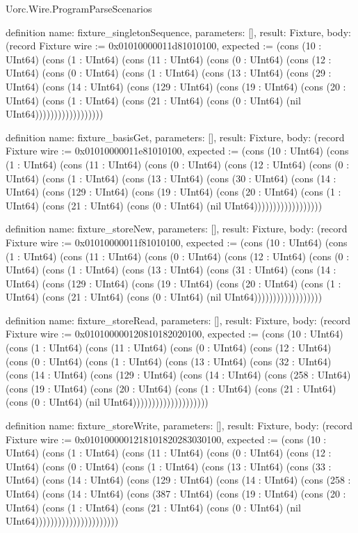 \begin{lexlean}{Uorc.Wire.ProgramParseScenarios}
\begin{semanticmodule}
definition{
  name: fixture_singletonSequence,
  parameters: [],
  result: Fixture,
  body: (record Fixture {wire := 0x01010000011d81010100, expected := (cons (10 : UInt64) (cons (1 : UInt64) (cons (11 : UInt64) (cons (0 : UInt64) (cons (12 : UInt64) (cons (0 : UInt64) (cons (1 : UInt64) (cons (13 : UInt64) (cons (29 : UInt64) (cons (14 : UInt64) (cons (129 : UInt64) (cons (19 : UInt64) (cons (20 : UInt64) (cons (1 : UInt64) (cons (21 : UInt64) (cons (0 : UInt64) (nil UInt64)))))))))))))))))})
}

definition{
  name: fixture_basisGet,
  parameters: [],
  result: Fixture,
  body: (record Fixture {wire := 0x01010000011e81010100, expected := (cons (10 : UInt64) (cons (1 : UInt64) (cons (11 : UInt64) (cons (0 : UInt64) (cons (12 : UInt64) (cons (0 : UInt64) (cons (1 : UInt64) (cons (13 : UInt64) (cons (30 : UInt64) (cons (14 : UInt64) (cons (129 : UInt64) (cons (19 : UInt64) (cons (20 : UInt64) (cons (1 : UInt64) (cons (21 : UInt64) (cons (0 : UInt64) (nil UInt64)))))))))))))))))})
}

definition{
  name: fixture_storeNew,
  parameters: [],
  result: Fixture,
  body: (record Fixture {wire := 0x01010000011f81010100, expected := (cons (10 : UInt64) (cons (1 : UInt64) (cons (11 : UInt64) (cons (0 : UInt64) (cons (12 : UInt64) (cons (0 : UInt64) (cons (1 : UInt64) (cons (13 : UInt64) (cons (31 : UInt64) (cons (14 : UInt64) (cons (129 : UInt64) (cons (19 : UInt64) (cons (20 : UInt64) (cons (1 : UInt64) (cons (21 : UInt64) (cons (0 : UInt64) (nil UInt64)))))))))))))))))})
}

definition{
  name: fixture_storeRead,
  parameters: [],
  result: Fixture,
  body: (record Fixture {wire := 0x010100000120810182020100, expected := (cons (10 : UInt64) (cons (1 : UInt64) (cons (11 : UInt64) (cons (0 : UInt64) (cons (12 : UInt64) (cons (0 : UInt64) (cons (1 : UInt64) (cons (13 : UInt64) (cons (32 : UInt64) (cons (14 : UInt64) (cons (129 : UInt64) (cons (14 : UInt64) (cons (258 : UInt64) (cons (19 : UInt64) (cons (20 : UInt64) (cons (1 : UInt64) (cons (21 : UInt64) (cons (0 : UInt64) (nil UInt64)))))))))))))))))))})
}

definition{
  name: fixture_storeWrite,
  parameters: [],
  result: Fixture,
  body: (record Fixture {wire := 0x0101000001218101820283030100, expected := (cons (10 : UInt64) (cons (1 : UInt64) (cons (11 : UInt64) (cons (0 : UInt64) (cons (12 : UInt64) (cons (0 : UInt64) (cons (1 : UInt64) (cons (13 : UInt64) (cons (33 : UInt64) (cons (14 : UInt64) (cons (129 : UInt64) (cons (14 : UInt64) (cons (258 : UInt64) (cons (14 : UInt64) (cons (387 : UInt64) (cons (19 : UInt64) (cons (20 : UInt64) (cons (1 : UInt64) (cons (21 : UInt64) (cons (0 : UInt64) (nil UInt64)))))))))))))))))))))})
}


\end{semanticmodule}
\end{lexlean}
